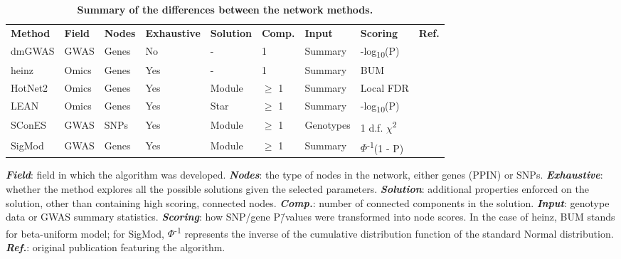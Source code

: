 \documentclass[10pt,letterpaper]{article}
\newlength\savedwidth
\newcommand\thickhline{\noalign{\global\savedwidth\arrayrulewidth\global\arrayrulewidth 2pt}%
\hline
\noalign{\global\arrayrulewidth\savedwidth}}
\begin{document}
\begin{table}[!ht]
  \begin{adjustwidth}{-2.25in}{0in} %
  \centering
  \caption{
  {\bf Summary of the differences between the network methods.}}
  \begin{tabular}{l|llllllll}
  {\bf Method} & {\bf Field } & {\bf Nodes} & {\bf Exhaustive} & {\bf Solution} & {\bf Comp.} & {\bf Input} & {\bf Scoring} & {\bf Ref.}\\ \thickhline
  dmGWAS & GWAS & Genes & No & - & 1 & Summary & -log\textsubscript{10}(P) & \cite{jia_dmgwas:_2011}\\
  heinz & Omics & Genes & Yes & - & 1 & Summary & BUM & \cite{dittrich_identifying_2008}\\
  HotNet2 & Omics & Genes & Yes & Module & \(\ge\) 1 & Summary & Local FDR & \cite{leiserson_pan-cancer_2015}\\
  LEAN & Omics & Genes & Yes & Star & \(\ge\) 1 & Summary & -log\textsubscript{10}(P) & \cite{gwinner_network-based_2016}\\
  SConES & GWAS & SNPs & Yes & Module & \(\ge\) 1 & Genotypes & 1 d.f. \(\chi\)\textsuperscript{2} & \cite{azencott_efficient_2013}\\
  SigMod & GWAS & Genes & Yes & Module & \(\ge\) 1 & Summary & $\Phi$\textsuperscript{-1}(1 - P) & \cite{liu_sigmod:_2017}\\
  \end{tabular}
  \begin{flushleft} \textbf{\emph{Field}}: field in which the algorithm was developed. \textbf{\emph{Nodes}}: the type of nodes in the network, either genes (PPIN) or SNPs. \textbf{\emph{Exhaustive}}: whether the method explores all the possible solutions given the selected parameters. \textbf{\emph{Solution}}: additional properties enforced on the solution, other than containing high scoring, connected nodes. \textbf{\emph{Comp.}}: number of connected components in the solution. \textbf{\emph{Input}}: genotype data or GWAS summary statistics. \textbf{\emph{Scoring}}: how SNP/gene P\=/values were transformed into node scores. In the case of heinz, BUM stands for beta-uniform model; for SigMod, $\Phi$\textsuperscript{-1} represents the inverse of the cumulative distribution function of the standard Normal distribution. \textbf{\emph{Ref.}}: original publication featuring the algorithm.
  \end{flushleft}
  \label{tab:method_comparison}
  \end{adjustwidth}
\end{table}
\end{document}
